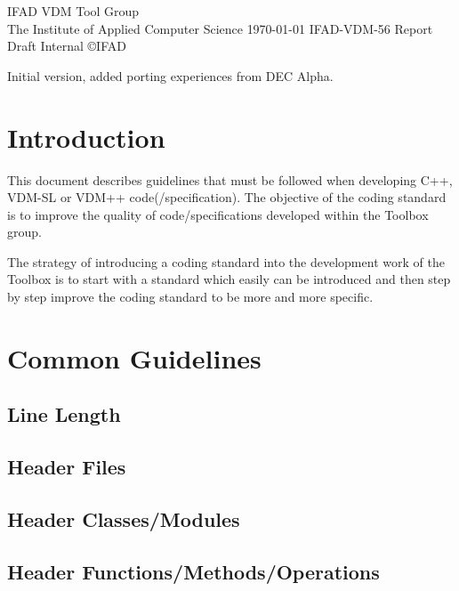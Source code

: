 \documentclass[11pt,a4paper]{article}
\begin{document}
         {IFAD VDM Tool Group \\
          The Institute of Applied Computer Science}
         {\today}
         {IFAD-VDM-56}
         {Report}
         {Draft}
         {Internal}
         {}
         {\copyright IFAD}
         {\item[1.0] Initial version, added porting experiences from
         DEC Alpha.}
         {\mbox{}}

\tableofcontents

\pagebreak
\renewcommand{\thepage}{\arabic{page}}
\setcounter{page}{1}
\parskip6pt
\parindent0pt


\section{Introduction}

This document describes guidelines that must be followed when
developing C++, VDM-SL or VDM++ code(/specification). The objective of
the coding standard is to improve the quality of code/specifications
developed within the Toolbox group. 


The strategy of introducing a coding standard into the development
work of the Toolbox is to start with a standard which easily can be
introduced and then step by step improve the coding standard to be
more and more specific. 

\section{Common Guidelines}

\subsection{Line Length}

\subsection{Header Files}

\subsection{Header Classes/Modules}

\subsection{Header Functions/Methods/Operations}
\end{document}
